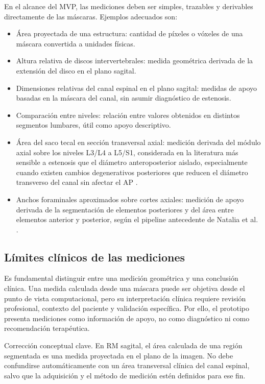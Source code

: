 En el alcance del MVP, las mediciones deben ser simples, trazables y derivables directamente de las máscaras. Ejemplos adecuados son:

\begin{itemize}
  \item Área proyectada de una estructura: cantidad de píxeles o vóxeles de una máscara convertida a unidades físicas.
  \item Altura relativa de discos intervertebrales: medida geométrica derivada de la extensión del disco en el plano sagital.
  \item Dimensiones relativas del canal espinal en el plano sagital: medidas de apoyo basadas en la máscara del canal, sin asumir diagnóstico de estenosis.
  \item Comparación entre niveles: relación entre valores obtenidos en distintos segmentos lumbares, útil como apoyo descriptivo.
  \item Área del saco tecal en sección transversal axial: medición derivada del módulo axial sobre los niveles L3/L4 a L5/S1, considerada en la literatura más sensible a estenosis que el diámetro anteroposterior aislado, especialmente cuando existen cambios degenerativos posteriores que reducen el diámetro transverso del canal sin afectar el AP \parencite{steurer_lumbar_stenosis_2011}.
  \item Anchos foraminales aproximados sobre cortes axiales: medición de apoyo derivada de la segmentación de elementos posteriores y del área entre elementos anterior y posterior, según el pipeline antecedente de Natalia et al. \parencite{natalia_measurement_2020}.
\end{itemize}

\subsection{Límites clínicos de las mediciones}

Es fundamental distinguir entre una medición geométrica y una conclusión clínica. Una medida calculada desde una máscara puede ser objetiva desde el punto de vista computacional, pero su interpretación clínica requiere revisión profesional, contexto del paciente y validación específica. Por ello, el prototipo presenta mediciones como información de apoyo, no como diagnóstico ni como recomendación terapéutica.

Corrección conceptual clave. En RM sagital, el área calculada de una región segmentada es una medida proyectada en el plano de la imagen. No debe confundirse automáticamente con un área transversal clínica del canal espinal, salvo que la adquisición y el método de medición estén definidos para ese fin.

